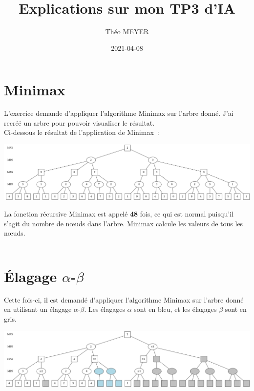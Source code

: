 \documentclass[11pt]{article}
\author{Théo MEYER}
\date{2021-04-08}
\title{Explications sur mon TP3 d'IA}
\begin{document}
\maketitle

\section{Minimax}
\label{sec:orgea30a24}

L'exercice demande d'appliquer l'algorithme Minimax sur l'arbre donné. J'ai recréé un arbre pour pouvoir visualiser le résultat.\\

Ci-dessous le résultat de l'application de Minimax :\\

\begin{center}
\includegraphics[width=.9\linewidth]{min_max.png}
\end{center}

La fonction récursive Minimax est appelé \textbf{48} fois, ce qui est normal puisqu'il s'agit du nombre de nœuds dans l'arbre. Minimax calcule les valeurs de tous les nœuds.\\

\pagebreak\\
\section{Élagage \(\alpha\)-\(\beta\)}
\label{sec:orgb80a71b}

Cette fois-ci, il est demandé d'appliquer l'algorithme Minimax sur l'arbre donné en utilisant un élagage \(\alpha\)-\(\beta\). Les élagages \(\alpha\) sont en bleu, et les élagages \(\beta\) sont en gris.\\

\begin{center}
\includegraphics[width=.9\linewidth]{alpha_beta.png}
\end{center}
\end{document}
